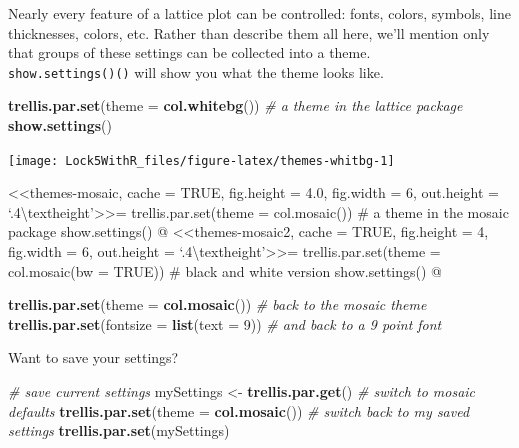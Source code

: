 \documentclass[]{book}
\newenvironment{Shaded}{\begin{snugshade}}{\end{snugshade}}
\newcommand{\CommentTok}[1]{\textcolor[rgb]{0.56,0.35,0.01}{\textit{#1}}}
\newcommand{\DataTypeTok}[1]{\textcolor[rgb]{0.13,0.29,0.53}{#1}}
\newcommand{\DecValTok}[1]{\textcolor[rgb]{0.00,0.00,0.81}{#1}}
\newcommand{\KeywordTok}[1]{\textcolor[rgb]{0.13,0.29,0.53}{\textbf{#1}}}
\newcommand{\NormalTok}[1]{#1}
\newcommand{\StringTok}[1]{\textcolor[rgb]{0.31,0.60,0.02}{#1}}
\begin{document}
Nearly every feature of a lattice plot can be controlled: fonts, colors,
symbols, line thicknesses, colors, etc. Rather than describe them all here,
we'll mention only that groups of these settings
can be collected into a theme.\\
\texttt{show.settings()()} will show you what the theme looks like.

\begin{Shaded}
\begin{Highlighting}[]
\KeywordTok{trellis.par.set}\NormalTok{(}\DataTypeTok{theme =} \KeywordTok{col.whitebg}\NormalTok{())      }\CommentTok{# a theme in the lattice package}
\KeywordTok{show.settings}\NormalTok{()}
\end{Highlighting}
\end{Shaded}

\texttt{[image: Lock5WithR\_files/figure-latex/themes-whitbg-1]}

\newpage

\textless\textless themes-mosaic, cache = TRUE, fig.height = 4.0, fig.width = 6, out.height = `.4\textbackslash textheight'\textgreater\textgreater=
trellis.par.set(theme = col.mosaic()) \# a theme in the mosaic package
show.settings()
@
\textless\textless themes-mosaic2, cache = TRUE, fig.height = 4, fig.width = 6, out.height = `.4\textbackslash textheight'\textgreater\textgreater=
trellis.par.set(theme = col.mosaic(bw = TRUE)) \# black and white version
show.settings()
@

\begin{Shaded}
\begin{Highlighting}[]
\KeywordTok{trellis.par.set}\NormalTok{(}\DataTypeTok{theme =} \KeywordTok{col.mosaic}\NormalTok{())       }\CommentTok{# back to the mosaic theme}
\KeywordTok{trellis.par.set}\NormalTok{(}\DataTypeTok{fontsize =} \KeywordTok{list}\NormalTok{(}\DataTypeTok{text =} \DecValTok{9}\NormalTok{))    }\CommentTok{# and back to a 9 point font}
\end{Highlighting}
\end{Shaded}

Want to save your settings?

\begin{Shaded}
\begin{Highlighting}[]
\CommentTok{# save current settings}
\NormalTok{mySettings <-}\StringTok{ }\KeywordTok{trellis.par.get}\NormalTok{()}
\CommentTok{# switch to mosaic defaults}
\KeywordTok{trellis.par.set}\NormalTok{(}\DataTypeTok{theme =} \KeywordTok{col.mosaic}\NormalTok{())}
\CommentTok{# switch back to my saved settings}
\KeywordTok{trellis.par.set}\NormalTok{(mySettings)}
\end{Highlighting}
\end{Shaded}
\end{document}
